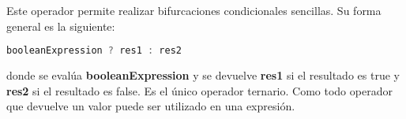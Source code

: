 Este operador permite realizar bifurcaciones condicionales sencillas. Su forma
general es la siguiente:
\begin{lstlisting}[language=C++]
booleanExpression ? res1 : res2
\end{lstlisting}
donde se evalúa \textbf{booleanExpression} y se devuelve \textbf{res1} si el resultado es true y \textbf{res2} si el resultado
es false. Es el único operador ternario. Como todo operador que devuelve
un valor puede ser utilizado en una expresión.